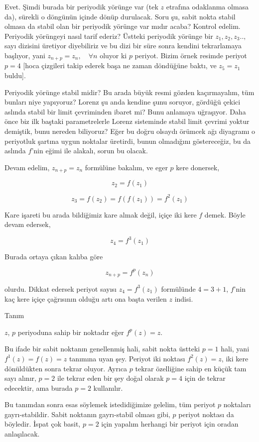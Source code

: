 \documentclass[12pt,fleqn]{article}\usepackage{../../common}
\begin{document}
Evet. Şimdi burada bir periyodik yörünge var (tek $z$ etrafına odaklanma
olmasa da), sürekli o döngünün içinde dönüp durulacak. Soru şu, sabit nokta
stabil olmasa da stabil olan bir periyodik yörünge var mıdır acaba? Kontrol
edelim. Periyodik yörüngeyi nasıl tarif ederiz? Üstteki periyodik yörünge
bir $z_1,z_2,z_3..,$ sayı dizisini üretiyor diyebiliriz ve bu dizi bir süre
sonra kendini tekrarlamaya başlıyor, yani $z_{n+p} = z_n, \quad \forall n$
oluyor ki $p$ periyot. Bizim örnek resimde periyot $p=4$ [hoca çizgileri
takip ederek başa ne zaman döndüğüne baktı, ve $z_5=z_1$ buldu].

Periyodik yörünge stabil midir? Bu arada büyük resmi gözden kaçırmayalım,
tüm bunları niye yapıyoruz? Lorenz şu anda kendine şunu soruyor, gördüğü
çekici aslında stabil bir limit çevriminden ibaret mi? Bunu anlamaya
uğraşıyor. Daha önce biz ilk baştaki parametrelerle Lorenz sisteminde
stabil limit çevrimi yoktur demiştik, bunu nereden biliyoruz? Eğer bu doğru
olsaydı örümcek ağı diyagramı o periyotluk şartına uygun noktalar
üretirdi, bunun olmadığını göstereceğiz, bu da aslında $f$'nin eğimi ile
alakalı, sorun bu olacak. 

Devam edelim, $z_{n+p} = z_n$ formülüne bakalım, ve eger $p$ kere donersek, 

$$ z_2 = f(z_1)$$

$$ z_3 = f(z_2) = f(f(z_1)) = f^2(z_1) $$

Kare işareti bu arada bildiğimiz kare almak değil, içiçe iki kere $f$
demek. Böyle devam edersek, 

$$ z_4 = f^3(z_1) $$

Burada ortaya çıkan kalıba göre 

$$ z_{n+p} = f^p(z_n) $$

olurdu. Dikkat edersek periyot sayısı $z_4 = f^3(z_1)$ formülünde $4=3+1$,
$f$'nin kaç kere içiçe çağrısının olduğu artı ona başta verilen $z$
indisi. 

Tanım

$z$, $p$ periyoduna sahip bir noktadır eğer $f^p(z) = z$. 

Bu ifade bir sabit noktanın genellenmiş hali, sabit nokta üstteki $p=1$
hali, yani $f^1(z) = f(z) = z$ tanımına uyan şey. Periyot iki noktası
$f^2(z)=z$, iki kere dönüldükten sonra tekrar oluyor. Ayrıca $p$ tekrar
özelliğine sahip en küçük tam sayı alınır, $p=2$ ile tekrar eden bir şey
doğal olarak $p=4$ için de tekrar edecektir, ama burada $p=2$ kullanılır. 

Bu tanımdan sonra esas söylemek istedidiğimize gelelim, tüm periyot $p$
noktaları gayrı-stabildir. Sabit noktanın gayrı-stabil olması gibi, $p$
periyot noktası da böyledir. İspat çok basit, $p=2$ için yapalım herhangi
bir periyot için oradan anlaşılacak. 
\end{document}
